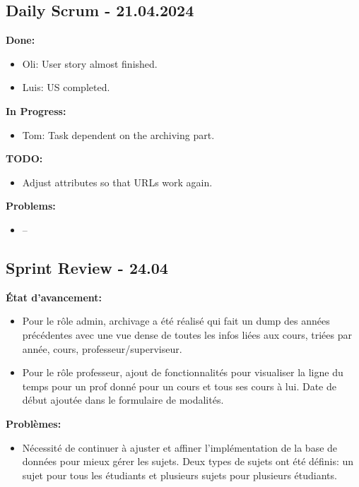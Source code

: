 \documentclass[11pt]{article}
\begin{document}
\subsection*{{\color{navy}Daily Scrum - 21.04.2024}}

\textbf{Done:}
\begin{itemize}
  \item Oli: User story almost finished.
  \item Luis: US completed.
\end{itemize}

\textbf{In Progress:}
\begin{itemize}
  \item Tom: Task dependent on the archiving part.
\end{itemize}

\textbf{TODO:}
\begin{itemize}
  \item Adjust attributes so that URLs work again.
\end{itemize}

\textbf{Problems:}
\begin{itemize}
  \item -- 
\end{itemize}








\subsection*{{\color{navy}Sprint Review - 24.04}}

\textbf{État d'avancement:}
\begin{itemize}
  \item Pour le rôle admin, archivage a été réalisé qui fait un dump des années précédentes avec une vue dense de toutes les infos liées aux cours, triées par année, cours, professeur/superviseur.
  \item Pour le rôle professeur, ajout de fonctionnalités pour visualiser la ligne du temps pour un prof donné pour un cours et tous ses cours à lui. Date de début ajoutée dans le formulaire de modalités.
\end{itemize}

\textbf{Problèmes:}
\begin{itemize}
  \item Nécessité de continuer à ajuster et affiner l'implémentation de la base de données pour mieux gérer les sujets. Deux types de sujets ont été définis: un sujet pour tous les étudiants et plusieurs sujets pour plusieurs étudiants.
\end{itemize}
\end{document}
